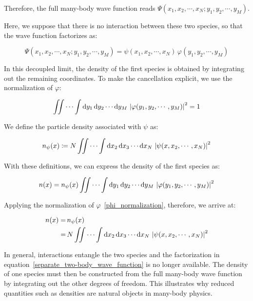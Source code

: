 Therefore, the full many-body wave function reads $\Psi(x_1,x_2,\cdots,x_N;y_1,y_2,\cdots,y_M)$.

Here, we suppose that there is no interaction between these two species, so that the wave function factorizes as:

\begin{equation}
    \Psi(x_1,x_2,\cdots,x_N;y_1,y_2,\cdots,y_M)
    =\psi(x_1,x_2,\cdots,x_N)\,\varphi(y_1,y_2,\cdots,y_M)
\label{separate_two-body_wave_function}
\end{equation}

In this decoupled limit, the density of the first species is obtained by integrating out the remaining coordinates.
To make the cancellation explicit, we use the normalization of $\varphi$:

\begin{equation}
    \iint\cdots\int\mathrm{d}{y_1}\,\mathrm{d}{y_2}\cdots\mathrm{d}{y_M}\,\left|\varphi(y_1,y_2,\cdots,y_M)\right|^2 = 1
\label{phi_normalization}
\end{equation}

We define the particle density associated with $\psi$ as:

\begin{equation}
    n_\psi(x)\coloneqq N\iint\cdots\int\mathrm{d}{x_2}\,\mathrm{d}{x_3}\cdots\mathrm{d}{x_N}\,\left|\psi(x,x_2,\cdots,x_N)\right|^2
\label{density_first_species_psi}
\end{equation}

With these definitions, we can express the density of the first species as:

\begin{equation}
    n(x)=n_\psi(x)\iint\cdots\int\mathrm{d}{y_1}\,\mathrm{d}{y_2}\cdots\mathrm{d}{y_M}\,\left|\varphi(y_1,y_2,\cdots,y_M)\right|^2
\label{two_body_density_factorized}
\end{equation}

Applying the normalization of $\varphi$~\eqref{phi_normalization},
therefore, we arrive at:

\begin{equation}
\begin{aligned}
    n(x)
    =& \,n_\psi(x) \\
    =& \,N\iint\cdots\int\mathrm{d}{x_2}\,\mathrm{d}{x_3}\cdots\mathrm{d}{x_N}\,\left|\psi(x,x_2,\cdots,x_N)\right|^2
\end{aligned}
\label{one_body_density_from_many_body_wave_function}
\end{equation}

In general, interactions entangle the two species and the factorization in equation~\eqref{separate_two-body_wave_function} is no longer available.
The density of one species must then be constructed from the full many-body wave function by integrating out the other degrees of freedom.
This illustrates why reduced quantities such as densities are natural objects in many-body physics.

